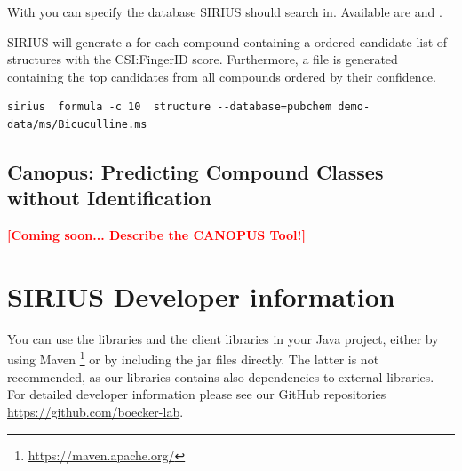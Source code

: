 \documentclass[letterpaper,10pt,openany,oneside]{sphinxmanual}
\newcommand{\todo}[1]{\xspace{\bfseries\sffamily\textcolor{red}{[#1]}}\xspace}
\begin{document}
With  you can specify the database SIRIUS should search in. Available are  and . 

SIRIUS will generate a  for each compound containing a ordered candidate list of structures with the CSI:FingerID score. Furthermore, a  file is generated containing the top candidates from all compounds ordered by their confidence.

\begin{Verbatim}[commandchars=\\\{\}]
sirius  formula -c 10  structure --database=pubchem demo-data/ms/Bicuculline.ms
\end{Verbatim}


\section{Canopus: Predicting Compound Classes without Identification}
\todo{Coming soon... Describe the CANOPUS Tool!}


\chapter{SIRIUS Developer information}
\label{library:sirius-java-library}\label{library::doc}

You can use the  libraries and the  client libraries in your Java project, either by using
Maven \footnote{\sphinxAtStartFootnote\url{https://maven.apache.org/}} or by
including the jar files directly. The latter is not recommended, as our libraries contains also dependencies to external libraries. For detailed developer information please see our GitHub repositories \url{https://github.com/boecker-lab}. 
\end{document}
